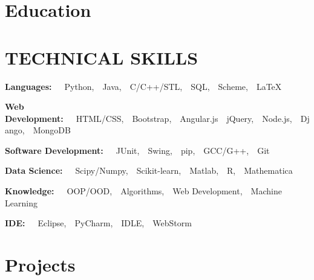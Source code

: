 \documentclass{resume}
\begin{document}





\section{Education}


\vspace{0.1in}

\section{TECHNICAL SKILLS}

\textbf{Languages:}~~~Python,~~Java,~~C/C++/STL,~~SQL,~~Scheme,~~\LaTeX


\textbf{Web Development:}~~~HTML/CSS,~~Bootstrap,~~Angular.js~~jQuery,~~Node.js,~~Django,~~MongoDB


\textbf{Software Development:}~~~JUnit,~~Swing,~~pip,~~GCC/G++,~~Git


\textbf{Data Science:}~~~Scipy/Numpy,~~Scikit-learn,~~Matlab,~~R,~~Mathematica


\textbf{Knowledge:}~~~OOP/OOD,~~Algorithms,~~Web Development,~~Machine Learning


\textbf{IDE:}~~~Eclipse,~~PyCharm,~~IDLE,~~WebStorm

\section{Projects}
\end{document}
